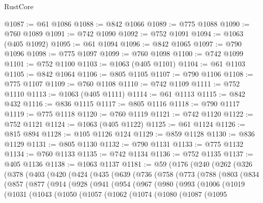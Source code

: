 \begin{lexlean}{RustCore}
\begin{coremodule}
{\begin{coremodule}
{{{{{{{{{{{{{{{{{{{{{{{{{{{{{{{{{{{{{{{{{{{{@1087 := @61 @1086
@1088 := @842 @1066
@1089 := @775 @1088
@1090 := @760 @1089
@1091 := @742 @1090
@1092 := @752 @1091
@1094 := @1063 (@405 @1092)
@1095 := @61 @1094
@1096 := @842 @1065
@1097 := @790 @1096
@1098 := @775 @1097
@1099 := @760 @1098
@1100 := @742 @1099
@1101 := @752 @1100
@1103 := @1063 (@405 @1101)
@1104 := @61 @1103
@1105 := @842 @1064
@1106 := @805 @1105
@1107 := @790 @1106
@1108 := @775 @1107
@1109 := @760 @1108
@1110 := @742 @1109
@1111 := @752 @1110
@1113 := @1063 (@405 @1111)
@1114 := @61 @1113
@1115 := @842 @432
@1116 := @836 @1115
@1117 := @805 @1116
@1118 := @790 @1117
@1119 := @775 @1118
@1120 := @760 @1119
@1121 := @742 @1120
@1122 := @752 @1121
@1124 := @1063 (@405 @1122)
@1125 := @61 @1124
@1126 := @815 @894
@1128 := @105 @1126 @124
@1129 := @859 @1128
@1130 := @836 @1129
@1131 := @805 @1130
@1132 := @790 @1131
@1133 := @775 @1132
@1134 := @760 @1133
@1135 := @742 @1134
@1136 := @752 @1135
@1137 := @405 @1136
@1138 := @1063 @1137
@1181 := @59
    (@176
      (@240
        (@262
          (@326
            (@378
              (@403
                (@420
                  (@424
                    (@435
                      (@639
                        (@736
                          (@758
                            (@773
                              (@788
                                (@803
                                  (@834
                                    (@857
                                      (@877
                                        (@914
                                          (@928
                                            (@941
                                              (@954
                                                (@967
                                                  (@980
                                                    (@993
                                                      (@1006
                                                        (@1019
                                                          (@1031
                                                            (@1043
                                                              (@1050
                                                                (@1057
                                                                  (@1062
                                                                    (@1074
                                                                      (@1080
                                                                        (@1087
                                                                          (@1095
}}}}}}}}}}}}}}}}}}}}}}}}}}}}}}}}}}}}}}}}}}}}
\end{coremodule}}
\end{coremodule}
\end{lexlean}
